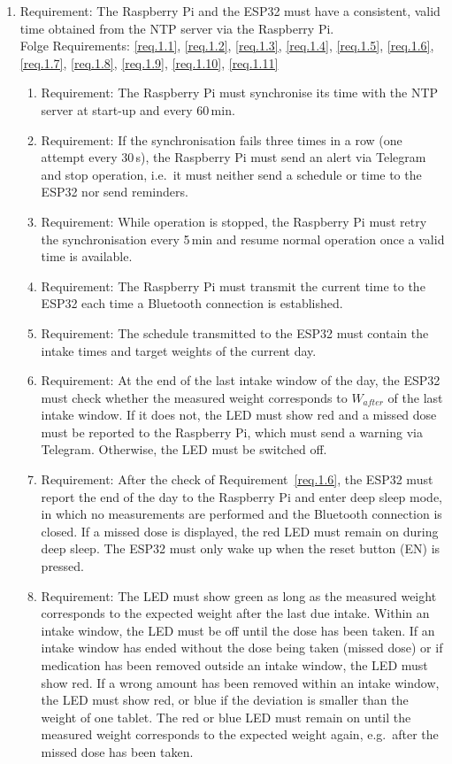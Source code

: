 	\begin{enumerate}[label*=\arabic*.]
		\item \label{req.1} Requirement: The Raspberry Pi and the ESP32 must have a consistent, valid time obtained from the NTP server via the Raspberry Pi. \\
		Folge Requirements: \ref{req.1.1}, \ref{req.1.2}, \ref{req.1.3}, \ref{req.1.4}, \ref{req.1.5}, \ref{req.1.6}, \ref{req.1.7}, \ref{req.1.8}, \ref{req.1.9}, \ref{req.1.10}, \ref{req.1.11}
		\begin{enumerate}[label*=\arabic*.]
			\item \label{req.1.1} Requirement: The Raspberry Pi must synchronise its time with the NTP server at start-up and every 60\,min.
			\item \label{req.1.2} Requirement: If the synchronisation fails three times in a row (one attempt every 30\,s), the Raspberry Pi must send an
			alert via Telegram and stop operation, i.e.\ it must neither send a schedule or time to the ESP32 nor send
			reminders.
			\item \label{req.1.3} Requirement: While operation is stopped, the Raspberry Pi must retry the synchronisation every 5\,min and resume normal
			operation once a valid time is available.
			\item \label{req.1.4} Requirement: The Raspberry Pi must transmit the current time to the ESP32 each time a Bluetooth connection is established.
			\item \label{req.1.5} Requirement: The schedule transmitted to the ESP32 must contain the intake times and target weights of the current day.
			\item \label{req.1.6} Requirement: At the end of the last intake window of the day, the ESP32 must check whether the measured weight corresponds to $W_{after}$ of the last intake window. If it does not, the LED must show red and a missed dose must be reported to the Raspberry Pi, which must send a warning via Telegram. Otherwise, the LED must be switched off.
			\item \label{req.1.7} Requirement: After the check of Requirement~\ref{req.1.6}, the ESP32 must report the end of the day to the Raspberry Pi and enter deep sleep mode, in which no measurements are performed and the Bluetooth connection is closed. If a missed dose is displayed, the red LED must remain on during deep sleep. The ESP32 must only wake up when the reset button (EN) is pressed.
			\item \label{req.1.8} Requirement: The LED must show green as long as the measured weight corresponds to the expected weight after the last due intake. Within an intake window, the LED must be off until the dose has been taken. If an intake window has ended without the dose being taken (missed dose) or if medication has been removed outside an intake window, the LED must show red. If a wrong amount has been removed within an intake window, the LED must show red, or blue if the deviation is smaller than the weight of one tablet. The red or blue LED must remain on until the measured weight corresponds to the expected weight again, e.g.\ after the missed dose has been taken.

\end{enumerate}
\end{enumerate}

